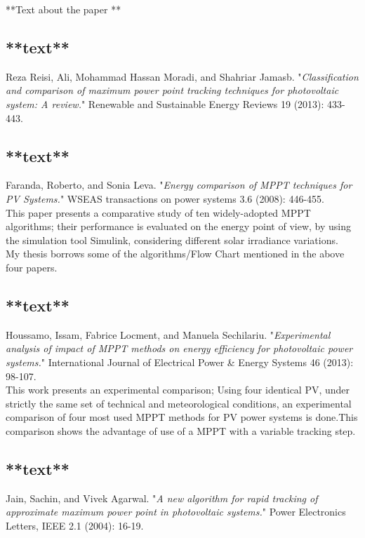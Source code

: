 **Text about the paper **

\subsection{**text**\cite{reza2013classification}}

Reza Reisi, Ali, Mohammad Hassan Moradi, and Shahriar Jamasb. "\textit{Classification and comparison of maximum power point tracking techniques for photovoltaic system: A review.}" Renewable and Sustainable Energy Reviews 19 (2013): 433-443.

\subsection{**text**\cite{faranda2008energy}}

Faranda, Roberto, and Sonia Leva. "\textit{Energy comparison of MPPT techniques for PV Systems.}" WSEAS transactions on power systems 3.6 (2008): 446-455.\\

This paper presents a comparative study of ten widely-adopted MPPT algorithms; their performance is evaluated on the energy point of view, by using the simulation tool Simulink{\textregistered}, considering different solar irradiance variations.\\

My thesis borrows some of the algorithms/Flow Chart mentioned in the above four papers. 

\subsection{**text**\cite{houssamo2013experimental}}

Houssamo, Issam, Fabrice Locment, and Manuela Sechilariu. "\textit{Experimental analysis of impact of MPPT methods on energy efficiency for photovoltaic power systems.}" International Journal of Electrical Power \& Energy Systems 46 (2013): 98-107.\\

This work presents an experimental comparison; Using four identical PV, under strictly the same set of technical and meteorological conditions, an experimental comparison  of four most used MPPT methods for PV power systems is done.This comparison shows the advantage of use of a MPPT with a variable tracking step.\\  

\subsection{**text**\cite{jain2004new}}
Jain, Sachin, and Vivek Agarwal. "\textit{A new algorithm for rapid tracking of approximate maximum power point in photovoltaic systems.}" Power Electronics Letters, IEEE 2.1 (2004): 16-19.\\

